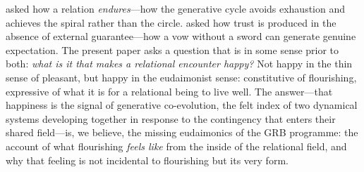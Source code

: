   \parencite{paperix} asked how a relation \emph{endures}---how the generative cycle avoids exhaustion and achieves the spiral rather than the circle.  asked how trust is produced in the absence of external guarantee---how a vow without a sword can generate genuine expectation. The present paper asks a question that is in some sense prior to both: \emph{what is it that makes a relational encounter happy?} Not happy in the thin sense of pleasant, but happy in the eudaimonist sense: constitutive of flourishing, expressive of what it is for a relational being to live well. The answer---that happiness is the signal of generative co-evolution, the felt index of two dynamical systems developing together in response to the contingency that enters their shared field---is, we believe, the missing eudaimonics of the GRB programme: the account of what flourishing \emph{feels like} from the inside of the relational field, and why that feeling is not incidental to flourishing but its very form.
